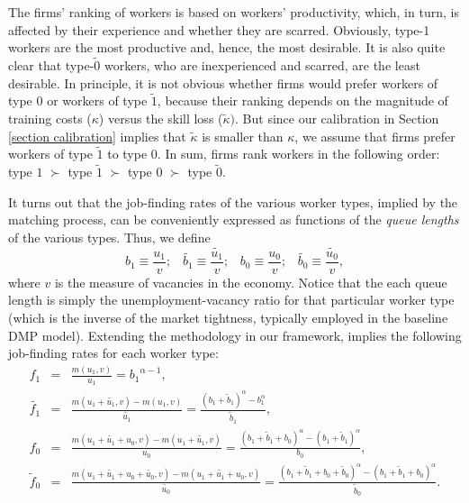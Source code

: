 \documentclass[12pt]{article} %
\theoremstyle{definition}
\begin{document}
The firms' ranking of workers is based on workers' productivity, which, in turn, is affected by their experience and whether they are scarred. Obviously, type-1 workers are the most productive and, hence, the most desirable. It is also quite clear that type-$\tilde{0}$ workers, who are inexperienced and scarred, are the least desirable. In principle, it is not obvious whether firms would prefer workers of type 0 or workers of type $\tilde{1}$, because their ranking depends on the magnitude of training costs ($\kappa$) versus the skill loss ($\tilde{\kappa})$. But since our calibration in Section \ref{section calibration} implies that $\tilde{\kappa}$ is smaller than $\kappa$, we assume that firms prefer workers of type $\tilde{1}$ to type $0$. In sum, firms rank workers in the following order: type $1$ $\succ$  type $\tilde{1}$ $\succ$ type 0 $\succ$  type $\tilde{0}$. 


It turns out that the job-finding rates of the various worker types, implied by the \cite{petrongolo2001looking} matching process, can be conveniently expressed as functions of the \textit{queue lengths} of the various types. Thus, we define 
\begin{equation}
b_1\equiv \frac{u_1}{v};\,\,\,\,\, \tilde{b_1}\equiv \frac{\tilde{u_1}}{v}; \,\,\,\,\, b_0\equiv \frac{u_0}{v};\,\,\,\,\, \tilde{b_0}\equiv \frac{\tilde{u_0}}{v}, \label{eq queue lengths}
\end{equation}where $v$ is the measure of vacancies in the economy. Notice that the each queue length is simply the unemployment-vacancy ratio for that particular worker type (which is the inverse of the market tightness, typically employed in the baseline DMP model). Extending the \cite{petrongolo2001looking} methodology in our framework, implies the following job-finding rates for each worker type: 
\begin{eqnarray*}
    f_1 &=& \frac{m(u_1,v)}{u_1} = {b_1}^{\alpha-1}, \\
     \tilde{f_1} &=& \frac{m(u_1+\tilde{u_1},v)-m(u_1,v)}{\tilde{u_1}} = \frac{(b_1+\tilde{b}_1)^\alpha - b_1^\alpha}{\tilde{b}_1}, \\
    f_0 &=& \frac{m(u_1+\tilde{u_1}+u_0,v)-m(u_1+\tilde{u_1},v)}{u_0} = \frac{(b_1+\tilde{b}_1+b_0)^\alpha - (b_1+\tilde{b}_1)^\alpha}{b_0}, \\
    \tilde{f}_0 &=& \frac{m(u_1+\tilde{u_1}+u_0+\tilde{u_0},v)-m(u_1+\tilde{u_1}+u_0,v)}{\tilde{u_0}} = \frac{(b_1+\tilde{b}_1+b_0+\tilde{b}_0)^\alpha - ({b_1+\tilde{b}_1+b_0})^\alpha}{\tilde{b}_0}. 
\end{eqnarray*}
\end{document}
